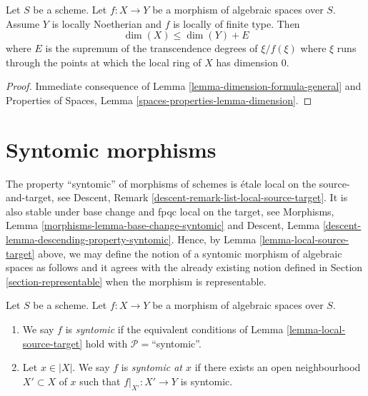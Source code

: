 \begin{lemma}
\label{lemma-alteration-dimension-general}
Let $S$ be a scheme.
Let $f : X \to Y$ be a morphism of algebraic spaces over $S$. Assume
$Y$ is locally Noetherian and $f$ is locally of finite type.
Then
$$
\dim(X) \leq \dim(Y) + E
$$
where $E$ is the supremum of the transcendence degrees of
$\xi/f(\xi)$ where $\xi$ runs through the points at
which the local ring of $X$ has dimension $0$.
\end{lemma}

\begin{proof}
Immediate consequence of Lemma \ref{lemma-dimension-formula-general}
and Properties of Spaces, Lemma \ref{spaces-properties-lemma-dimension}.
\end{proof}







\section{Syntomic morphisms}
\label{section-syntomic}

\noindent
The property ``syntomic'' of morphisms of schemes is
\'etale local on the source-and-target, see
Descent, Remark \ref{descent-remark-list-local-source-target}.
It is also stable under base change and fpqc local on the target, see
Morphisms, Lemma \ref{morphisms-lemma-base-change-syntomic} and
Descent, Lemma \ref{descent-lemma-descending-property-syntomic}.
Hence, by
Lemma \ref{lemma-local-source-target}
above, we may define the notion of a syntomic morphism of algebraic spaces as
follows and it agrees with the already existing notion defined in
Section \ref{section-representable}
when the morphism is representable.

\begin{definition}
\label{definition-syntomic}
Let $S$ be a scheme.
Let $f : X \to Y$ be a morphism of algebraic spaces over $S$.
\begin{enumerate}
\item We say $f$ is {\it syntomic} if the equivalent conditions of
Lemma \ref{lemma-local-source-target}
hold with $\mathcal{P} =$``syntomic''.
\item Let $x \in |X|$. We say $f$ is {\it syntomic at $x$} if
there exists an open neighbourhood $X' \subset X$ of $x$ such
that $f|_{X'} : X' \to Y$ is syntomic.
\end{enumerate}
\end{definition}

